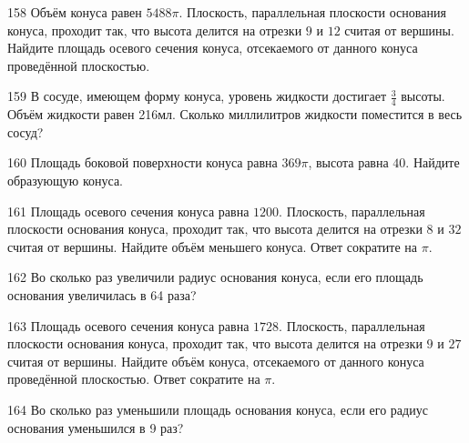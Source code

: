 \documentclass[a4paper]{article}
\begin{document}
\begin{taskBN}{158}
Объём конуса равен $5488\pi$. Плоскость, параллельная плоскости основания конуса,  проходит так, что высота делится на отрезки $9$ и $12$ считая от вершины. Найдите площадь осевого сечения конуса, отсекаемого от данного конуса проведённой плоскостью. 
\end{taskBN}

\begin{taskBN}{159}
В сосуде, имеющем форму конуса, уровень жидкости достигает $\frac{3}{4}$ высоты. Объём жидкости равен 216мл. Сколько миллилитров жидкости поместится в весь сосуд?
\end{taskBN}

\begin{taskBN}{160}
Площадь боковой поверхности конуса равна $369\pi$, высота равна $40$. Найдите образующую конуса. 
\end{taskBN}

\begin{taskBN}{161}
Площадь осевого сечения конуса равна $1200$. Плоскость, параллельная плоскости основания конуса,  проходит так, что высота делится на отрезки $8$ и $32$ считая от вершины. Найдите объём меньшего конуса. Ответ сократите на $\pi$.
\end{taskBN}

\begin{taskBN}{162}
Во сколько раз увеличили радиус основания конуса, если его площадь основания увеличилась в 64 раза?
\end{taskBN}

\begin{taskBN}{163}
Площадь осевого сечения конуса равна $1728$. Плоскость, параллельная плоскости основания конуса,  проходит так, что высота делится на отрезки $9$ и $27$ считая от вершины. Найдите объём конуса, отсекаемого от данного конуса проведённой плоскостью. Ответ сократите на $\pi$.
\end{taskBN}

\begin{taskBN}{164}
Во сколько раз уменьшили площадь основания конуса, если его радиус основания уменьшился в 9 раз?
\end{taskBN}
\end{document}
